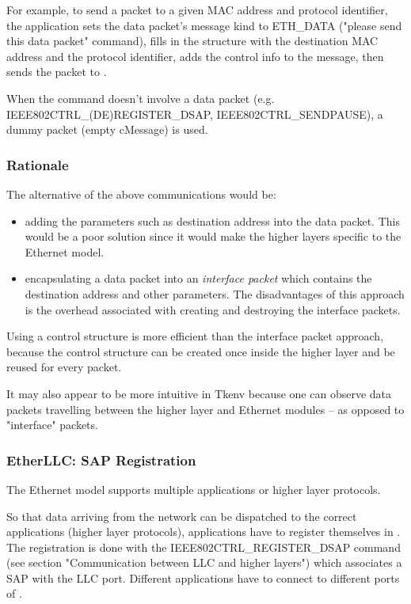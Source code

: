 For example, to send a packet to a given MAC address and protocol
identifier, the application sets the data packet's message kind
to ETH\_DATA ("please send this data packet" command),
fills in the  structure with the destination MAC address and
the protocol identifier, adds the control info to the message, then sends
the packet to .

When the command doesn't involve a data packet (e.g.
IEEE802CTRL\_(DE)REGISTER\_DSAP, IEEE802CTRL\_SENDPAUSE), a dummy packet
(empty cMessage) is used.

\subsubsection{Rationale}

The alternative of the above communications would be:

\begin{itemize}
  \item adding the parameters such as destination address into the data
    packet. This would be a poor solution since it would make the
    higher layers specific to the Ethernet model.
  \item encapsulating a data packet into an \textit{interface packet} which
    contains the destination address and other parameters. The
    disadvantages of this approach is the overhead associated with
    creating and destroying the interface packets.
\end{itemize}

Using a control structure is more efficient than the interface packet
approach, because the control structure can be created once inside
the higher layer and be reused for every packet.

It may also appear to be more intuitive in Tkenv because one can observe
data packets travelling between the higher layer and Ethernet
modules -- as opposed to "interface" packets.


\subsubsection{EtherLLC: SAP Registration}

The Ethernet model supports multiple applications or higher layer
protocols.

So that data arriving from the network can be dispatched to the
correct applications (higher layer protocols), applications
have to register themselves in . The registration
is done with the IEEE802CTRL\_REGISTER\_DSAP command
(see section "Communication between LLC and higher layers")
which associates a SAP with the LLC port. Different applications
have to connect to different ports of .

